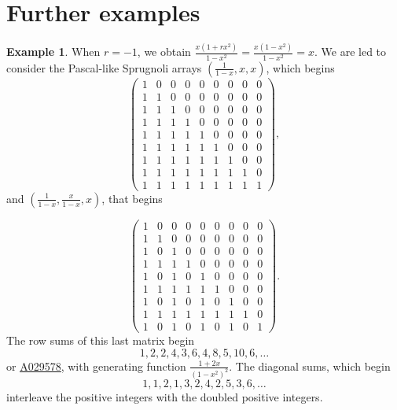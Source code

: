 \documentclass[12pt,reqno]{article}
\theoremstyle{definition}
\newtheorem{example}[theorem]{Example}
\newcommand{\seqnum}[1]{\href{http://oeis.org/#1}{\underline{#1}}}
\begin{document}
\section{Further examples}
\begin{example}
When $r=-1$, we obtain $\frac{x(1+rx^2)}{1-x^2}=\frac{x(1-x^2)}{1-x^2}=x$. We are led to consider the Pascal-like Sprugnoli arrays
$\left(\frac{1}{1-x}, x, x\right)$, which begins
$$\left(\begin{array}{cccccccccc}
1 & 0 & 0 & 0 & 0 & 0 & 0 & 0 & 0 \\
1 & 1 & 0 & 0 & 0 & 0 & 0 & 0 & 0 \\
1 & 1 & 1 & 0 & 0 & 0 & 0 & 0 & 0 \\
1 & 1 & 1 & 1 & 0 & 0 & 0 & 0 & 0 \\
1 & 1 & 1 & 1 & 1 & 0 & 0 & 0 & 0 \\
1 & 1 & 1 & 1 & 1 & 1 & 0 & 0 & 0 \\
1 & 1 & 1 & 1 & 1 & 1 & 1 & 0 & 0 \\
1 & 1 & 1 & 1 & 1 & 1 & 1 & 1 & 0 \\
1 & 1 & 1 & 1 & 1 & 1 & 1 & 1 & 1
\end{array}\right),$$ and
$\left(\frac{1}{1-x}, \frac{x}{1-x}, x\right)$, that begins

$$\left(\begin{array}{cccccccccc}
1 & 0 & 0 & 0 & 0 & 0 & 0 & 0 & 0 \\
1 & 1 & 0 & 0 & 0 & 0 & 0 & 0 & 0 \\
1 & 0 & 1 & 0 & 0 & 0 & 0 & 0 & 0 \\
1 & 1 & 1 & 1 & 0 & 0 & 0 & 0 & 0 \\
1 & 0 & 1 & 0 & 1 & 0 & 0 & 0 & 0 \\
1 & 1 & 1 & 1 & 1 & 1 & 0 & 0 & 0 \\
1 & 0 & 1 & 0 & 1 & 0 & 1 & 0 & 0 \\
1 & 1 & 1 & 1 & 1 & 1 & 1 & 1 & 0 \\
1 & 0 & 1 & 0 & 1 & 0 & 1 & 0 & 1
\end{array}\right).$$ The row sums of this last matrix begin
$$1, 2, 2, 4, 3, 6, 4, 8, 5, 10, 6,\ldots$$ or \seqnum{A029578}, with generating function $\frac{1+2x}{(1-x^2)^2}$. The diagonal sums, which begin $$1, 1, 2, 1, 3, 2, 4, 2, 5, 3, 6,\ldots$$ interleave the positive integers with the doubled positive integers.
\end{example}
\end{document}
